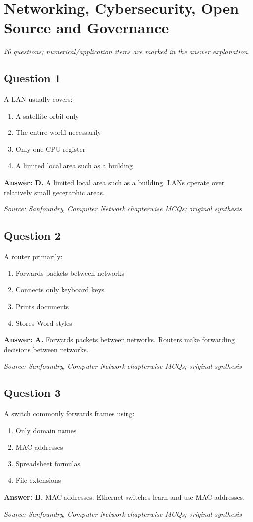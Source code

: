 \documentclass[11pt,a4paper]{book}
\newcommand{\source}[1]{\par\smallskip\textit{Source: #1}}
\newcommand{\answer}[2]{\par\textbf{Answer: #1.} #2}
\begin{document}
\chapter{Networking, Cybersecurity, Open Source and Governance}
\textit{20 questions; numerical/application items are marked in the answer explanation.}
\section*{Question 1}
A LAN usually covers:
\begin{enumerate}[label=\Alph*.]
\item A satellite orbit only
\item The entire world necessarily
\item Only one CPU register
\item A limited local area such as a building
\end{enumerate}
\answer{D}{A limited local area such as a building. LANs operate over relatively small geographic areas.}
\source{Sanfoundry, Computer Network chapterwise MCQs; original synthesis}
\section*{Question 2}
A router primarily:
\begin{enumerate}[label=\Alph*.]
\item Forwards packets between networks
\item Connects only keyboard keys
\item Prints documents
\item Stores Word styles
\end{enumerate}
\answer{A}{Forwards packets between networks. Routers make forwarding decisions between networks.}
\source{Sanfoundry, Computer Network chapterwise MCQs; original synthesis}
\section*{Question 3}
A switch commonly forwards frames using:
\begin{enumerate}[label=\Alph*.]
\item Only domain names
\item MAC addresses
\item Spreadsheet formulas
\item File extensions
\end{enumerate}
\answer{B}{MAC addresses. Ethernet switches learn and use MAC addresses.}
\source{Sanfoundry, Computer Network chapterwise MCQs; original synthesis}
\end{document}

